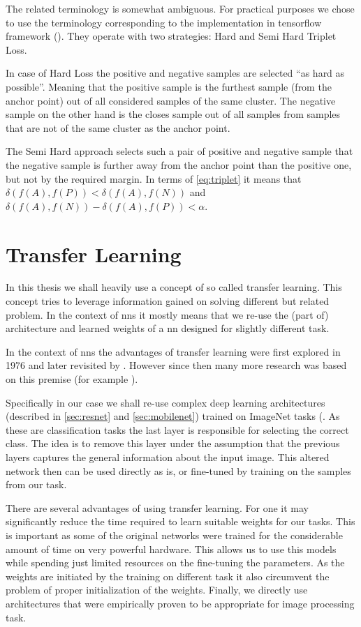 The related terminology is somewhat ambiguous. For practical purposes we
chose to use the terminology corresponding to the implementation in tensorflow
framework (\cite{tensorflow}). They operate with two strategies: Hard and Semi
Hard Triplet Loss.

In case of Hard Loss the positive and negative samples are selected ``as hard as
possible''. Meaning that the positive sample is the furthest sample (from the
anchor point) out of all considered samples of the same cluster. The negative
sample on the other hand is the closes sample out of all samples from samples
that are not of the same cluster as the anchor point.

The Semi Hard approach selects such a pair of positive and negative sample
that the negative sample is further away from the anchor point than the 
positive one, but not by the required margin. In terms of \autoref{eq:triplet}
it means that $\delta(f(A), f(P)) < \delta(f(A), f(N))$ and
$\delta(f(A), f(N)) - \delta(f(A), f(P)) < \alpha$.

\section{Transfer Learning}

In this thesis we shall heavily use a concept of so called transfer learning.
This concept tries to leverage information gained on solving different but
related problem. In the context of \glspl{nn} it mostly means that we re-use
the (part of) architecture and learned weights of a \gls{nn} designed for
slightly different task.

In the context of \glspl{nn} the advantages of transfer learning were first
explored in 1976 and later revisited by \cite{transferreviewed}. However since
then many more research was based on this premise (for example
\cite{transferlearning}).

Specifically in our case we shall re-use complex deep learning architectures
(described in \autoref{sec:resnet} and \autoref{sec:mobilenet}) trained on
ImageNet tasks (\cite{imagenetresults}. As these are classification tasks
the last layer is responsible for selecting the correct class. The idea
is to remove this layer under the assumption that the previous layers
captures the general information about the input image. This altered
network then can be used directly as is, or fine-tuned by training on the
samples from our task.

There are several advantages of using transfer learning. For one it may
significantly reduce the time required to learn suitable weights for our
tasks. This is important as some of the original networks were trained
for the considerable amount of time on very powerful hardware. This allows
us to use this models while spending just limited resources on the fine-tuning
the parameters. As the weights are initiated by the training on different
task it also circumvent the problem of proper initialization of the weights.
Finally, we directly use architectures that were empirically proven to be
appropriate for image processing task.

